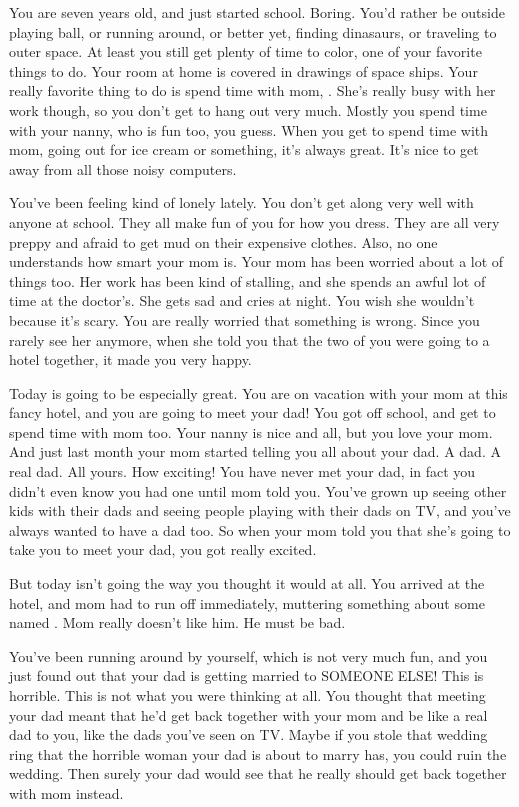 \documentclass[char]{guildcamp1}
\begin{document}
\name{\cKid{}}

You are seven years old, and just started school. Boring. You'd rather be outside playing ball, or running around, or better yet, finding dinasaurs, or traveling to outer space. At least you still get plenty of time to color, one of your favorite things to do. Your room at home is covered in drawings of space ships. Your really favorite thing to do is spend time with mom, \cScientist{}. She's really busy with her work though, so you don't get to hang out very much. Mostly you spend time with your nanny, who is fun too, you guess. When you get to spend time with mom, going out for ice cream or something, it's always great. It's nice to get away from all those noisy computers.

You've been feeling kind of lonely lately. You don't get along very well with anyone at school. They all make fun of you for how you dress. They are all very preppy and afraid to get mud on their expensive clothes.  Also, no one understands how smart your mom is. Your mom has been worried about a lot of things too. Her work has been kind of stalling, and she spends an awful lot of time at the doctor's. She gets sad and cries at night. You wish she wouldn't because it's scary. You are really worried that something is wrong. Since you rarely see her anymore, when she told you that the two of you were going to a hotel together, it made you very happy.

Today is going to be especially great. You are on vacation with your mom at this fancy hotel, and you are going to meet your dad! You got off school, and get to spend time with mom too. Your nanny is nice and all, but you love your mom. And just last month your mom started telling you all about your dad. A dad. A real dad. All yours. How exciting! You have never met your dad, in fact you didn't even know you had one until mom told you. You've grown up seeing other kids with their dads and seeing people playing with their dads on TV, and you've always wanted to have a dad too. So when your mom told you that she's going to take you to meet your dad, you got really excited.

But today isn't going the way you thought it would at all. You arrived at the hotel, and mom had to run off immediately, muttering something about some \cRival{\human} named \cRival{}. Mom really doesn't like him. He must be bad.

You've been running around by yourself, which is not very much fun, and you just found out that your dad is getting married to SOMEONE ELSE! This is horrible. This is not what you were thinking at all. You thought that meeting your dad meant that he'd get back together with your mom and be like a real dad to you, like the dads you've seen on TV. Maybe if you stole that wedding ring that the horrible woman your dad is about to marry has, you could ruin the wedding. Then surely your dad would see that he really should get back together with mom instead.
\end{document}
